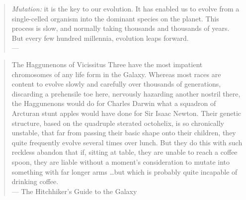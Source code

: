 \thispagestyle{empty}
\null
\vfill
\begin{quote}
	\emph{Mutation:} it is the key to our evolution. It has enabled us to evolve
	from a single-celled organism into the dominant species on the planet. This
	process is slow, and normally taking thousands and thousands of years. But
	every few hundred millennia, evolution leaps forward.\\
	\null\hfill--- \citet{singer2000}
\end{quote}
\begin{quote}
The Haggunenons of Vicissitus Three have the most impatient chromosomes of any
life form in the Galaxy. Whereas most races are content to evolve slowly and
carefully over thousands of generations, discarding a prehensile toe here,
nervously hazarding another nostril there, the Haggunenons would do for Charles
Darwin what a squadron of Arcturan stunt apples would have done for Sir Isaac
Newton. Their genetic structure, based on the quadruple sterated octohelix, is
so chronically unstable, that far from passing their basic shape onto their
children, they quite frequently evolve several times over lunch. But they do
this with such reckless abandon that if, sitting at table, they are unable to
reach a coffee spoon, they are liable without a moment's consideration to mutate
into something with far longer arms \dots but which is probably quite incapable
of drinking coffee.\\
\null\hfill--- The Hitchhiker's Guide to the Galaxy \citep{adams1979}
\end{quote}
